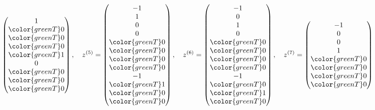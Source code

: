 \begin{loesung}
\[\begin{pmatrix}
              1\\
\color{greenT} 0\\
\color{greenT} 0\\
\color{greenT} 0\\
\color{greenT} 1\\
              0\\
\color{greenT} 0\\
\color{greenT} 0\\
\color{greenT} 0
\end{pmatrix}
,\quad
z^{(5)}=
\begin{pmatrix}
             -1\\
              1\\
              0\\
              0\\
\color{greenT} 0\\
\color{greenT} 0\\
\color{greenT} 0\\
\color{greenT} 0\\
             -1\\
\color{greenT} 1\\
\color{greenT} 0\\
\color{greenT} 0
\end{pmatrix}
,\quad
z^{(6)}=\begin{pmatrix}
             -1\\
              0\\
              1\\
              0\\
\color{greenT} 0\\
\color{greenT} 0\\
\color{greenT} 0\\
\color{greenT} 0\\
             -1\\
\color{greenT} 0\\
\color{greenT} 1\\
\color{greenT} 0
\end{pmatrix}
,\quad
z^{(7)}=\begin{pmatrix}
             -1\\
              0\\
              0\\
              1\\
\color{greenT} 0\\
\color{greenT} 0\\
\color{greenT} 0\\
\color{greenT} 0\\

\end{pmatrix}\]
\end{loesung}

